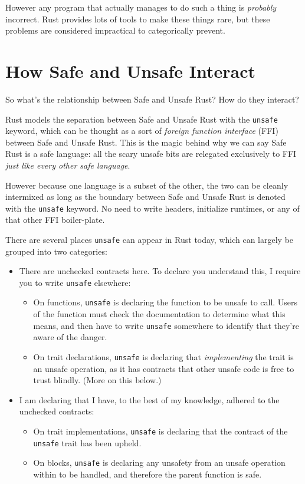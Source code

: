 \documentclass[a4paper,]{book}
\begin{document}
However any program that actually manages to do such a thing is
\emph{probably} incorrect. Rust provides lots of tools to make these
things rare, but these problems are considered impractical to
categorically prevent.

\section{How Safe and Unsafe Interact}\label{sec--safe-unsafe-meaning}

So what's the relationship between Safe and Unsafe Rust? How do they
interact?

Rust models the separation between Safe and Unsafe Rust with the
\texttt{unsafe} keyword, which can be thought as a sort of \emph{foreign
function interface} (FFI) between Safe and Unsafe Rust. This is the
magic behind why we can say Safe Rust is a safe language: all the scary
unsafe bits are relegated exclusively to FFI \emph{just like every other
safe language}.

However because one language is a subset of the other, the two can be
cleanly intermixed as long as the boundary between Safe and Unsafe Rust
is denoted with the \texttt{unsafe} keyword. No need to write headers,
initialize runtimes, or any of that other FFI boiler-plate.

There are several places \texttt{unsafe} can appear in Rust today, which
can largely be grouped into two categories:

\begin{itemize}
\itemsep1pt\parskip0pt
\item
  There are unchecked contracts here. To declare you understand this, I
  require you to write \texttt{unsafe} elsewhere:

  \begin{itemize}
  \itemsep1pt\parskip0pt
  \item
    On functions, \texttt{unsafe} is declaring the function to be unsafe
    to call. Users of the function must check the documentation to
    determine what this means, and then have to write \texttt{unsafe}
    somewhere to identify that they're aware of the danger.
  \item
    On trait declarations, \texttt{unsafe} is declaring that
    \emph{implementing} the trait is an unsafe operation, as it has
    contracts that other unsafe code is free to trust blindly. (More on
    this below.)
  \end{itemize}
\item
  I am declaring that I have, to the best of my knowledge, adhered to
  the unchecked contracts:

  \begin{itemize}
  \itemsep1pt\parskip0pt
  \item
    On trait implementations, \texttt{unsafe} is declaring that the
    contract of the \texttt{unsafe} trait has been upheld.
  \item
    On blocks, \texttt{unsafe} is declaring any unsafety from an unsafe
    operation within to be handled, and therefore the parent function is
    safe.
  \end{itemize}
\end{itemize}
\end{document}
